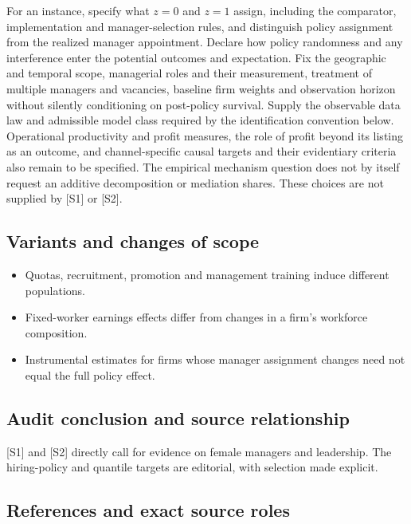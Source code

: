 \documentclass[11pt,a4paper]{article}
\begin{document}
For an instance, specify what $z=0$ and $z=1$ assign, including the comparator, implementation and manager-selection rules, and distinguish policy assignment from the realized manager appointment. Declare how policy randomness and any interference enter the potential outcomes and expectation. Fix the geographic and temporal scope, managerial roles and their measurement, treatment of multiple managers and vacancies, baseline firm weights and observation horizon without silently conditioning on post-policy survival. Supply the observable data law and admissible model class required by the identification convention below. Operational productivity and profit measures, the role of profit beyond its listing as an outcome, and channel-specific causal targets and their evidentiary criteria also remain to be specified. The empirical mechanism question does not by itself request an additive decomposition or mediation shares. These choices are not supplied by [S1] or [S2].

\subsection*{Variants and changes of scope}

\begin{itemize}
\item Quotas, recruitment, promotion and management training induce different populations.
\item Fixed-worker earnings effects differ from changes in a firm's workforce composition.
\item Instrumental estimates for firms whose manager assignment changes need not equal the full policy effect.
\end{itemize}

\subsection*{Audit conclusion and source relationship}

[S1] and [S2] directly call for evidence on female managers and leadership. The hiring-policy and quantile targets are editorial, with selection made explicit.

\subsection*{References and exact source roles}
\end{document}
